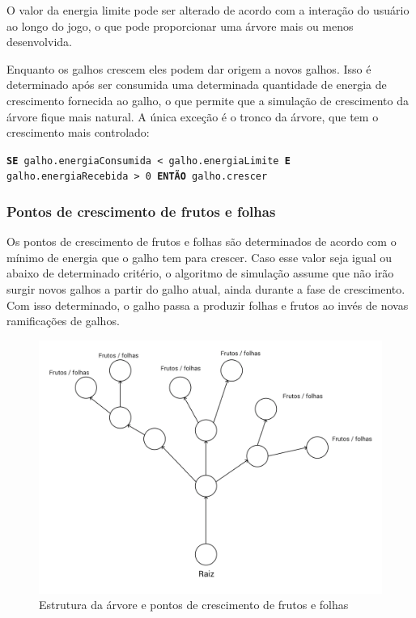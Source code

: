 \documentclass[12pt]{article}
\begin{document}
O valor da energia limite pode
ser alterado de acordo com a intera\c c\~ao do usu\'ario ao longo do jogo, o que pode proporcionar uma \'arvore mais
ou menos desenvolvida.

Enquanto os galhos crescem eles podem dar origem a novos galhos. Isso \'e determinado ap\'os ser consumida uma determinada
quantidade de energia de crescimento fornecida ao galho, o que permite que a simula\c c\~ao de crescimento da \'arvore
fique mais natural. A \'unica exce\c c\~ao \'e o tronco da \'arvore, que tem o crescimento
mais controlado:

\texttt{\footnotesize{\textbf{SE} galho.energiaConsumida < galho.energiaLimite \textbf{E} galho.energiaRecebida > 0
\textbf{ENT\~AO} galho.crescer}}

\subsubsection{Pontos de crescimento de frutos e folhas}
Os pontos de crescimento de frutos e folhas s\~ao determinados de acordo com o m\'inimo de energia que o galho
tem para crescer. Caso esse valor seja igual ou abaixo de determinado crit\'erio, o algoritmo de simula\c c\~ao assume
que n\~ao ir\~ao surgir novos galhos a partir do galho atual, ainda durante a fase de crescimento. Com isso determinado,
o galho passa a produzir folhas e frutos ao inv\'es de novas ramifica\c c\~oes de galhos.

	\begin{figure}[ht!]
	\begin{center}
		\includegraphics[scale=0.15]{img/PI3_Arvore.png}
		\footnotesize \caption{Estrutura da \'arvore e pontos de crescimento de frutos e folhas }
	\end{center}
	\end{figure}	
\newpage
\end{document}
